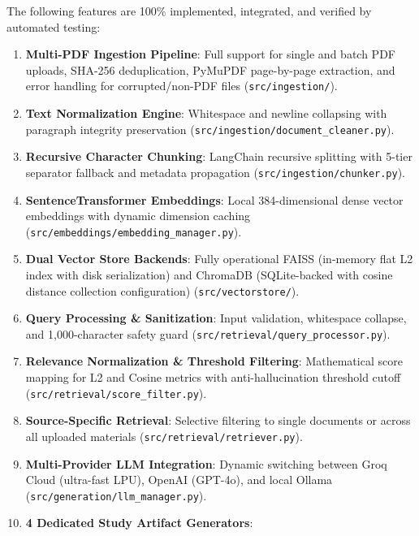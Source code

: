 \documentclass[
]{article}
\providecommand{\tightlist}{%
  \setlength{\itemsep}{0pt}\setlength{\parskip}{0pt}}
\begin{document}
The following features are 100\% implemented, integrated, and verified
by automated testing:

\begin{enumerate}
\def\labelenumi{\arabic{enumi}.}
\tightlist
\item
  \textbf{Multi-PDF Ingestion Pipeline}: Full support for single and
  batch PDF uploads, SHA-256 deduplication, PyMuPDF page-by-page
  extraction, and error handling for corrupted/non-PDF files
  (\texttt{src/\allowbreak ingestion/\allowbreak }).
\item
  \textbf{Text Normalization Engine}: Whitespace and newline collapsing
  with paragraph integrity preservation
  (\texttt{src/\allowbreak ingestion/\allowbreak document\_\allowbreak cleaner.\allowbreak py}).
\item
  \textbf{Recursive Character Chunking}: LangChain recursive splitting
  with 5-tier separator fallback and metadata propagation
  (\texttt{src/\allowbreak ingestion/\allowbreak chunker.\allowbreak py}).
\item
  \textbf{SentenceTransformer Embeddings}: Local 384-dimensional dense
  vector embeddings with dynamic dimension caching
  (\texttt{src/\allowbreak embeddings/\allowbreak embedding\_\allowbreak manager.\allowbreak py}).
\item
  \textbf{Dual Vector Store Backends}: Fully operational FAISS
  (in-memory flat L2 index with disk serialization) and ChromaDB
  (SQLite-backed with cosine distance collection configuration)
  (\texttt{src/\allowbreak vectorstore/\allowbreak }).
\item
  \textbf{Query Processing \& Sanitization}: Input validation,
  whitespace collapse, and 1,000-character safety guard
  (\texttt{src/\allowbreak retrieval/\allowbreak query\_\allowbreak processor.\allowbreak py}).
\item
  \textbf{Relevance Normalization \& Threshold Filtering}: Mathematical
  score mapping for L2 and Cosine metrics with anti-hallucination
  threshold cutoff (\texttt{src/\allowbreak retrieval/\allowbreak score\_\allowbreak filter.\allowbreak py}).
\item
  \textbf{Source-Specific Retrieval}: Selective filtering to single
  documents or across all uploaded materials
  (\texttt{src/\allowbreak retrieval/\allowbreak retriever.\allowbreak py}).
\item
  \textbf{Multi-Provider LLM Integration}: Dynamic switching between
  Groq Cloud (ultra-fast LPU), OpenAI (GPT-4o), and local Ollama
  (\texttt{src/\allowbreak generation/\allowbreak llm\_\allowbreak manager.\allowbreak py}).
\item
  \textbf{4 Dedicated Study Artifact Generators}:


\end{enumerate}
\end{document}
